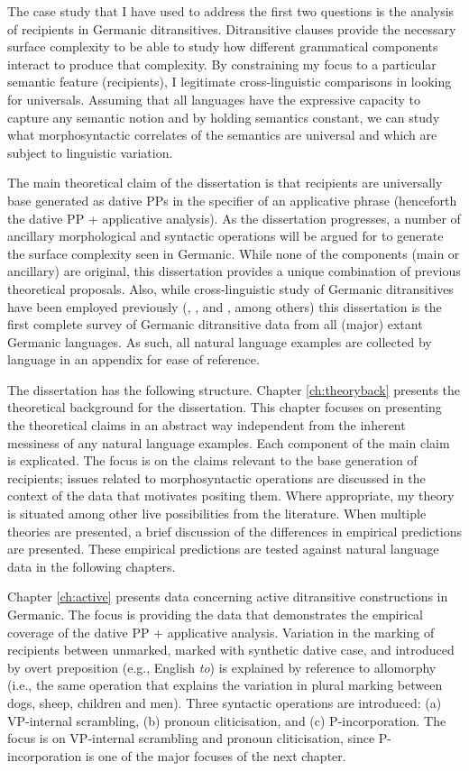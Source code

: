 The case study that I have used to address the first two questions is the analysis of recipients in Germanic ditransitives. Ditransitive clauses provide the necessary surface complexity to be able to study how different grammatical components interact to produce that complexity. By constraining my focus to a particular semantic feature (recipients), I legitimate cross-linguistic comparisons in looking for universals. Assuming that all languages have the expressive capacity to capture any semantic notion and by  holding semantics constant, we can study  what morphosyntactic correlates of the semantics are universal and which are subject to linguistic variation.

The main theoretical claim of the dissertation is that recipients are universally base generated as dative PPs in the specifier of an applicative phrase (henceforth the dative PP + applicative analysis). As the dissertation progresses, a number of ancillary morphological and syntactic operations will be argued for to generate the surface complexity seen in Germanic. While none of the components (main or ancillary) are original, this dissertation provides a unique combination of previous theoretical proposals. Also, while cross-linguistic study of Germanic ditransitives have been employed previously (\citealt{Falk.1990}, \citealt{Sprouse.1995}, and \citealt{Holmberg.1995}, among others) this dissertation is the first complete survey of Germanic ditransitive data from all (major) extant Germanic languages. As such, all natural language examples are collected by language in an appendix for ease of reference.

The dissertation has the following structure. Chapter \ref{ch:theoryback} presents the theoretical background for the dissertation. This chapter focuses on presenting the theoretical claims in an abstract way independent from the inherent messiness of any natural language examples. Each component of the main claim is explicated. The focus is on the claims relevant to the base generation of recipients; issues related to morphosyntactic operations are discussed in the context of the data that motivates positing them. Where appropriate, my theory is situated among other live possibilities from the literature. When multiple theories are presented, a brief discussion of the differences in empirical predictions are presented. These empirical predictions are tested against natural language data in the following chapters.

Chapter \ref{ch:active} presents data concerning active ditransitive constructions in Germanic. The focus is providing the data that demonstrates the empirical coverage of the dative PP + applicative analysis. Variation in the marking of recipients between unmarked, marked with synthetic dative case, and introduced by overt preposition (e.g., English \textit{to}) is explained by reference to allomorphy (i.e., the same operation that explains the variation in plural marking between dogs, sheep, children and men). Three syntactic operations are introduced: (a) VP-internal scrambling, (b) pronoun cliticisation, and (c) P-incorporation. The focus is on VP-internal scrambling and pronoun cliticisation, since P-incorporation is one of the major focuses of the next chapter.

